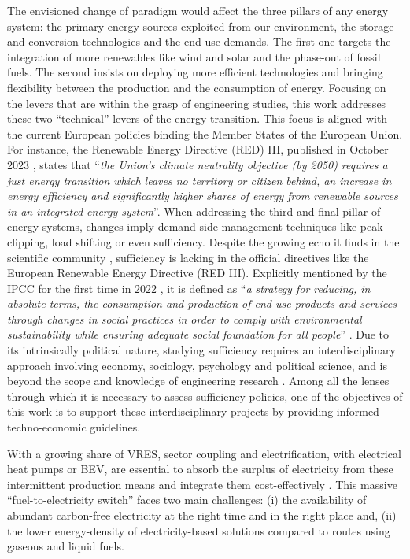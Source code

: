 \documentclass[11pt,twoside,a4paper,english]{article}
\def\ie{i.e.,}
\begin{document}
The envisioned change of paradigm would affect the three pillars of any energy system: the primary energy sources exploited from our environment, the storage and conversion technologies and the end-use demands. The first one targets the integration of more renewables like wind and solar and the phase-out of fossil fuels. The second insists on deploying more efficient technologies and bringing flexibility between the production and the consumption of energy. Focusing on the levers that are within the grasp of engineering studies, this work addresses these two ``technical'' levers of the energy transition. This focus is aligned with the current European policies binding the Member States of the European Union. For instance, the Renewable Energy Directive (RED) III, published in October 2023 \cite{REDIII}, states that ``\emph{the Union’s climate neutrality objective (by 2050) requires a just energy transition which leaves no territory or citizen behind, an increase in energy efficiency and significantly higher shares of energy from renewable sources in an integrated energy system}''.%
When addressing the third and final pillar of energy systems, changes imply demand-side-management techniques like peak clipping, load shifting \cite{bakare2023comprehensive} or even sufficiency. Despite the growing echo it finds in the scientific community \cite{o2018good}, sufficiency is lacking in the official directives like the European Renewable Energy Directive (RED III). Explicitly mentioned by the IPCC for the first time in 2022 \cite{IPCC2022}, it is defined as ``\emph{a strategy for reducing, in absolute terms, the consumption and production of end-use products and services through changes in social practices in order to comply with environmental sustainability while ensuring adequate social foundation for all people}'' \cite{lage2023citizens}. Due to its intrinsically political nature, studying sufficiency requires an interdisciplinary approach involving economy, sociology, psychology and political science, and is beyond the scope and knowledge of engineering research \cite{schmidt2015interdisciplinary}. Among all the lenses through which it is necessary to assess sufficiency policies, one of the objectives of this work is to support these interdisciplinary projects by providing informed techno-economic guidelines.

With a growing share of \gls{VRES}, sector coupling and electrification, with electrical heat pumps or \gls{BEV}, are essential to absorb the surplus of electricity from these intermittent production means \cite{robinius2017linking} and integrate them cost-effectively \cite{brown2018response, limpensECOS2021}. This massive ``fuel-to-electricity switch'' faces two main challenges: (i) the availability of abundant carbon-free electricity at the right time and in the right place and,  (ii) the lower energy-density of electricity-based solutions compared to routes using gaseous and liquid fuels. 
\end{document}
